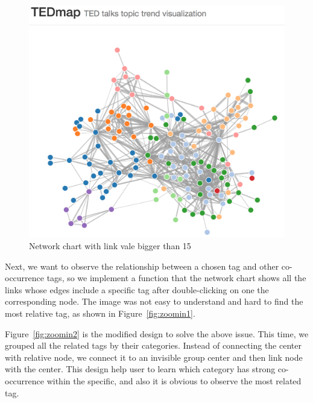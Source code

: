 \documentclass{report}
\numberwithin{figure}{section}
\begin{document}
\begin{figure}
\begin{center}
\includegraphics[scale=0.5]{networkChartProto}
\caption{Network chart with link vale bigger than 15}
\label{fig:networkwithcolor}
\end{center}
\end{figure}	

\quad Next, we want to observe the relationship between a chosen tag and other co-occurrence tags, so we implement a function that the network chart shows all the links whose edges include a specific tag after double-clicking on one the corresponding node. The image was not easy to understand and hard to find the most relative tag, as shown in Figure~\ref{fig:zoomin1}.

\quad Figure~\ref{fig:zoomin2} is the modified design to solve the above issue. This time, we grouped all the related tags by their categories. Instead of connecting the center with relative node, we connect it to an invisible group center and then link node with the center. This design help user to learn which category has strong co-occurrence within the specific, and also it is obvious to observe the most related tag.
\end{document}
